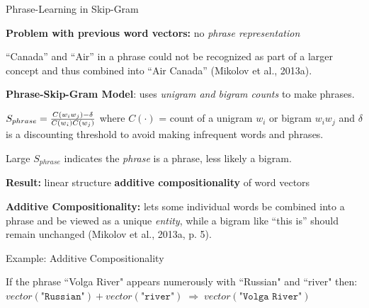 \begin{frame}{Phrase-Learning in Skip-Gram}
    \vfill
    
    \begin{itemizeSpaced}{3pt}
    
        \pinkbox \textbf{Problem with previous word vectors:} no \emph{phrase representation}
        
        \begin{itemizeSpaced}{3pt}
            \arrowitem “Canada” and “Air” in a phrase could not be recognized as part of a larger concept and thus combined into “Air Canada” (Mikolov et al., 2013a).
        \end{itemizeSpaced}
        
        \pinkbox \textbf{Phrase-Skip-Gram Model}: uses \emph{unigram and bigram counts} to make phrases.
        \begin{itemizeSpaced}{3pt}
            
            \item ${\large S_{phrase} = \frac{C(w_i w_j) - \delta} {C(w_i)C(w_j)} }$ where $C(\cdot)$ = count of a unigram $w_i$ or bigram $w_i w_j$ and $\delta$ is a discounting threshold to avoid making infrequent words and phrases.
            
            \item Large $S_{phrase}$ indicates the \emph{phrase} is a phrase, less likely a bigram. 
        \end{itemizeSpaced}
        
        
        \item \textbf{Result: } linear structure \textbf{additive compositionality} of word vectors 
        
        \begin{itemizeSpaced}{3pt}
            \pinkbox \textbf{Additive Compositionality: }lets some individual words be combined into a phrase and be viewed as a unique \emph{entity}, while a bigram like “this is” should remain unchanged (Mikolov et al., 2013a, p. 5).
            
        \end{itemizeSpaced} 
        
        \begin{exampleBlock}{Example: Additive Compositionality}
        
        If the phrase ``Volga River" appears numerously with ``Russian" and ``river" then: $vector(\texttt{"Russian"}) \! + \! vector(\texttt{"river"}) \; \Rightarrow \; vector(\texttt{"Volga River"})$
        
        \end{exampleBlock}
        
        
    \end{itemizeSpaced}
    
\end{frame}